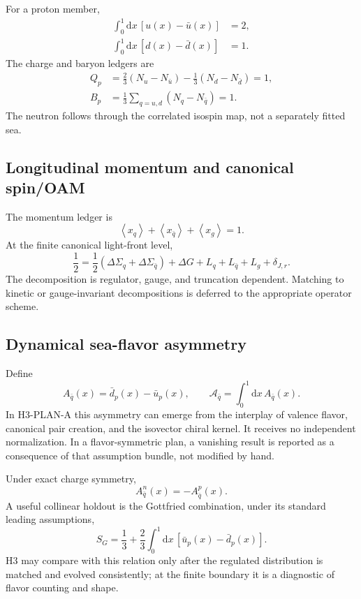 \documentclass[11pt]{article}
\newcommand{\dd}{\mathrm{d}}
\newcommand{\avg}[1]{\left\langle #1\right\rangle}
\begin{document}
For a proton member,
\begin{align}
 \int_0^1\dd x\,[u(x)-\bar u(x)]&=2,
 \\
 \int_0^1\dd x\,[d(x)-\bar d(x)]&=1.
 \label{eq:valence-ledger}
\end{align}
The charge and baryon ledgers are
\begin{align}
 Q_p
 &={}
 \frac23(N_u-N_{\bar u})
 -\frac13(N_d-N_{\bar d})=1,
 \\
 B_p
 &={}
 \frac13\sum_{q=u,d}(N_q-N_{\bar q})=1.
\end{align}
The neutron follows through the correlated isospin map, not a separately
fitted sea.

\subsection{Longitudinal momentum and canonical spin/OAM}

The momentum ledger is
\begin{equation}
 \avg{x_q}+\avg{x_{\bar q}}+\avg{x_g}=1.
 \label{eq:momentum-ledger}
\end{equation}
At the finite canonical light-front level,
\begin{equation}
 \frac12
 =
 \frac12\left(\Delta\Sigma_q+\Delta\Sigma_{\bar q}\right)
 +\Delta G
 +L_q+L_{\bar q}+L_g
 +\delta_{J,r}.
 \label{eq:spin-ledger}
\end{equation}
The decomposition is regulator, gauge, and truncation dependent.  Matching to
kinetic or gauge-invariant decompositions is deferred to the appropriate
operator scheme.

\subsection{Dynamical sea-flavor asymmetry}

Define
\begin{equation}
 A_{\bar q}(x)
 =\bar d_p(x)-\bar u_p(x),
 \qquad
 \mathcal A_{\bar q}
 =\int_0^1\dd x\,A_{\bar q}(x).
 \label{eq:sea-asymmetry}
\end{equation}
In H3-PLAN-A this asymmetry can emerge from the interplay of valence flavor,
canonical pair creation, and the isovector chiral kernel.  It receives no
independent normalization.  In a flavor-symmetric plan, a vanishing result is
reported as a consequence of that assumption bundle, not modified by hand.

Under exact charge symmetry,
\begin{equation}
 A_{\bar q}^{n}(x)=-A_{\bar q}^{p}(x).
\end{equation}
A useful collinear holdout is the Gottfried combination, under its standard
leading assumptions,
\begin{equation}
 S_G
 =\frac13+\frac23\int_0^1\dd x\,
 \left[\bar u_p(x)-\bar d_p(x)\right].
\end{equation}
H3 may compare with this relation only after the regulated distribution is
matched and evolved consistently; at the finite boundary it is a diagnostic
of flavor counting and shape.
\end{document}
